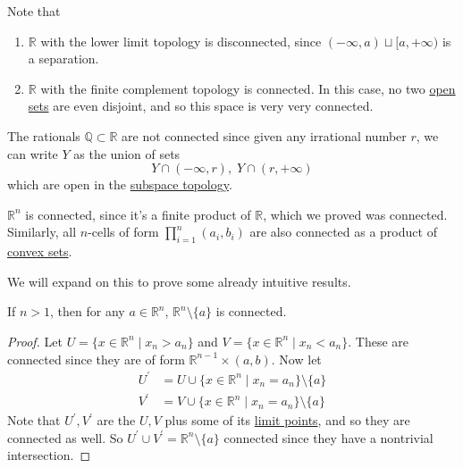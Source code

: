   \begin{example}
    \label{ex:more-topologies-on-real-lines}
    Note that 
    \begin{enumerate}
      \item $\mathbb{R}$ with the lower limit topology is disconnected, since $(-\infty, a) \sqcup [a, +\infty)$ is a separation. 
      \item $\mathbb{R}$ with the finite complement topology is connected. In this case, no two \hyperref[def:open-set]{open sets} are even disjoint, and so this space is very very connected. 
    \end{enumerate}
  \end{example}

  \begin{example}
    \label{ex:dense-disconnected-sets}
    The rationals $\mathbb{Q} \subset \mathbb{R}$ are not connected since given any irrational number $r$, we can write $Y$ as the union of sets
    \begin{equation}
      Y \cap (-\infty, r), \; Y \cap (r, +\infty)
    \end{equation}
    which are open in the \hyperref[def:subspace-topology]{subspace topology}. 
  \end{example}

  \begin{example}
    \label{ex:connected-components-in-rn}
    $\mathbb{R}^n$ is connected, since it's a finite product of $\mathbb{R}$, which we proved was connected. Similarly, all $n$-cells of form $\prod_{i=1}^n (a_i, b_i)$ are also connected as a product of \hyperref[st-def:convex-sets]{convex sets}. 
  \end{example} 

  We will expand on this to prove some already intuitive results. 

  \begin{theorem}
    \label{thm:connectedness-of-the-punctured-plane}
    If $n > 1$, then for any $a \in \mathbb{R}^n$, $\mathbb{R}^n \setminus \{a\}$ is connected. 
  \end{theorem}
  \begin{proof}
    Let $U = \{x \in \mathbb{R}^n \mid x_n > a_n\}$ and $V = \{x \in \mathbb{R}^n \mid x_n < a_n\}$. These are connected since they are of form $\mathbb{R}^{n-1} \times (a, b)$. Now let 
    \begin{align}
      U^\prime & = U \cup \{x \in \mathbb{R}^n \mid x_n = a_n\} \setminus \{a\} \\
      V^\prime & = V \cup \{x \in \mathbb{R}^n \mid x_n = a_n\} \setminus \{a\} 
    \end{align}
    Note that $U^\prime, V^\prime$ are the $U, V$ plus some of its \hyperref[def:limit-point]{limit points}, and so they are connected as well. So $U^\prime \cup V^\prime = \mathbb{R}^n \setminus \{a\}$ connected since they have a nontrivial intersection. 
  \end{proof}

